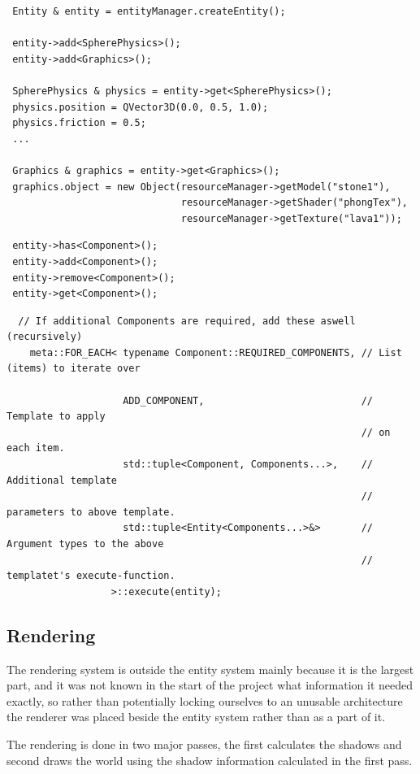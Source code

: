 \begin{lstlisting}
 Entity & entity = entityManager.createEntity();
 
 entity->add<SpherePhysics>();
 entity->add<Graphics>();
 
 SpherePhysics & physics = entity->get<SpherePhysics>();
 physics.position = QVector3D(0.0, 0.5, 1.0);
 physics.friction = 0.5;
 ...
 
 Graphics & graphics = entity->get<Graphics>();
 graphics.object = new Object(resourceManager->getModel("stone1"),
                              resourceManager->getShader("phongTex"),
                              resourceManager->getTexture("lava1")); 
\end{lstlisting}

\begin{lstlisting}
 entity->has<Component>();
 entity->add<Component>();
 entity->remove<Component>();
 entity->get<Component>();
\end{lstlisting}

\begin{lstlisting}
  // If additional Components are required, add these aswell (recursively)
    meta::FOR_EACH< typename Component::REQUIRED_COMPONENTS, // List (items) to iterate over
    
                    ADD_COMPONENT,                           // Template to apply
                                                             // on each item.
                    std::tuple<Component, Components...>,    // Additional template
                                                             // parameters to above template.
                    std::tuple<Entity<Components...>&>       // Argument types to the above
                                                             // templatet's execute-function.
                  >::execute(entity);

\end{lstlisting}

\subsection{Rendering}
The rendering system is outside the entity system mainly because it is the largest part, and it was not known in the start of the project what information it needed exactly, so rather than potentially locking ourselves to an unusable architecture the renderer was placed beside the entity system rather than as a part of it.

The rendering is done in two major passes, the first calculates the shadows and second draws the world using the shadow information calculated in the first pass.

